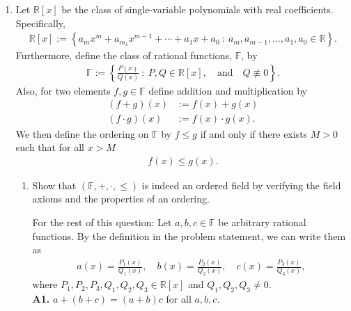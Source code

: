 \documentclass [10pt]{article}
\newcommand{\jg}[1]{{\color{blue} #1}}
\begin{document}
\begin{enumerate}

\item Let $\mathbb{R}[x]$ be the class of single-variable polynomials with real
coefficients. Specifically,
\begin{align*}
\mathbb{R}[x]:= \left\{ a_{m}x^m+ a_{m_1}x^{m-1}+ \cdots +a_1 x + a_0~:~
a_m, a_{m-1}, \dots, a_1, a_0 \in \mathbb{R} \right\}.
\end{align*}
Furthermore, define the class of rational functions, $\mathbb{F}$, by
\begin{align*}
\mathbb{F} := \left\{ \frac{P(x)}{Q(x)}~:~ P, Q \in \mathbb{R}[x], \quad \text{and} \quad  Q \not\equiv 0 \right\}.
\end{align*}
Also, for two elements $f, g \in \mathbb{F}$ define addition and multiplication by
\begin{align*}
(f+g)(x)&:= f(x) +g(x)\\
(f\cdot g)(x) &:= f(x)\cdot g(x).
\end{align*}
We then define the ordering on $\mathbb{F}$ by $f \leq g$ if and only if there
exists $M>0$ such that for all $x>M$
\begin{align*}
f(x) \leq g(x).
\end{align*}
\begin{enumerate}
\item Show that $(\mathbb{F}, +, \cdot, \leq)$ is indeed an ordered field
by verifying the field axioms and the properties of an ordering.

\jg{
For the rest of this question: Let $a,b,c \in \mathbb{F}$ be arbitrary rational functions. By the definition in the problem statement, we can write them as 
\begin{align*}
    a(x) = \frac{P_1(x)}{Q_1(x)}, \quad b(x) = \frac{P_2(x)}{Q_2(x)}, \quad c(x) = \frac{P_3(x)}{Q_3(x)},
\end{align*}
where $P_1, P_2, P_3, Q_1, Q_2, Q_3 \in \mathbb{R}[x]$ and $Q_1, Q_2, Q_3 \neq 0$. \\

\textbf{A1.} $a + (b + c) = (a + b) c$ for all $a,b,c$. 

}
\end{enumerate}
\end{enumerate}
\end{document}
